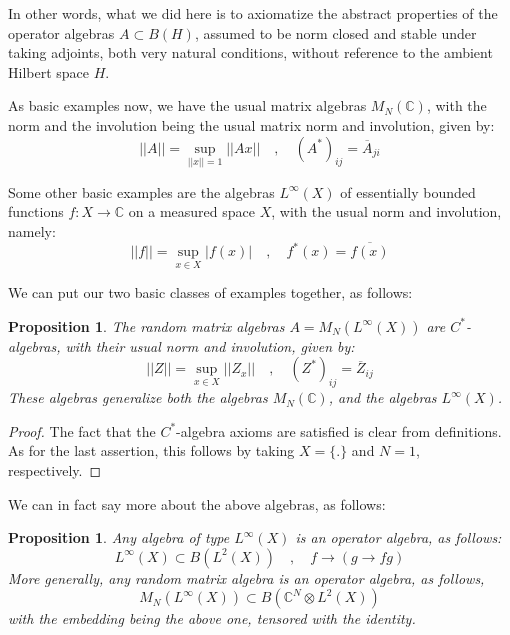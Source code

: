 \documentclass[12pt]{amsbook}
\newtheorem{proposition}[theorem]{Proposition}
\begin{document}
In other words, what we did here is to axiomatize the abstract properties of the operator algebras $A\subset B(H)$, assumed to be norm closed and stable under taking adjoints, both very natural conditions, without reference to the ambient Hilbert space $H$.

\bigskip

As basic examples now, we have the usual matrix algebras $M_N(\mathbb C)$, with the norm and the involution being the usual matrix norm and involution, given by:
$$||A||=\sup_{||x||=1}||Ax||\quad,\quad 
(A^*)_{ij}=\overline{A}_{ji}$$

Some other basic examples are the algebras $L^\infty(X)$ of essentially bounded functions $f:X\to\mathbb C$ on a measured space $X$, with the usual norm and involution, namely:
$$||f||=\sup_{x\in X}|f(x)|\quad,\quad 
f^*(x)=\overline{f(x)}$$

We can put our two basic classes of examples together, as follows:

\begin{proposition}
The random matrix algebras $A=M_N(L^\infty(X))$ are $C^*$-algebras, with their usual norm and involution, given by:
$$||Z||=\sup_{x\in X}||Z_x||\quad,\quad 
(Z^*)_{ij}=\overline{Z}_{ij}$$
These algebras generalize both the algebras $M_N(\mathbb C)$, and the algebras $L^\infty(X)$.
\end{proposition}

\begin{proof}
The fact that the $C^*$-algebra axioms are satisfied is clear from definitions. As for the last assertion, this follows by taking $X=\{.\}$ and $N=1$, respectively.
\end{proof}

We can in fact say more about the above algebras, as follows:

\begin{proposition}
Any algebra of type $L^\infty(X)$ is an operator algebra, as follows:
$$L^\infty(X)\subset B(L^2(X))\quad,\quad 
f\to(g\to fg)$$
More generally, any random matrix algebra is an operator algebra, as follows,
$$M_N(L^\infty(X))\subset B\left(\mathbb C^N\otimes L^2(X)\right)$$
with the embedding being the above one, tensored with the identity.
\end{proposition}
\end{document}
